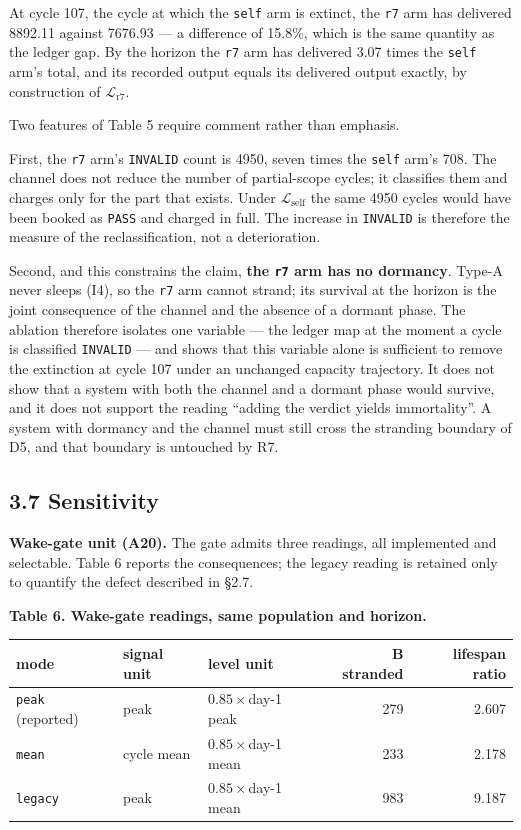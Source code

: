 \documentclass[11pt,a4paper]{article}
\newcounter{none}
\begin{document}
At cycle 107, the cycle at which the \texttt{self} arm is extinct, the \texttt{r7} arm has
delivered 8892.11 against 7676.93 --- a difference of 15.8\%, which is the same
quantity as the ledger gap. By the horizon the \texttt{r7} arm has delivered 3.07 times
the \texttt{self} arm's total, and its recorded output equals its delivered output
exactly, by construction of \(\mathcal{L}_{\mathrm{r7}}\).

Two features of Table 5 require comment rather than emphasis.

First, the \texttt{r7} arm's \texttt{INVALID} count is 4950, seven times the \texttt{self} arm's 708.
The channel does not reduce the number of partial-scope cycles; it classifies them
and charges only for the part that exists. Under \(\mathcal{L}_{\mathrm{self}}\) the
same 4950 cycles would have been booked as \texttt{PASS} and charged in full. The
increase in \texttt{INVALID} is therefore the measure of the reclassification, not a
deterioration.

Second, and this constrains the claim, \textbf{the \texttt{r7} arm has no dormancy}. Type-A
never sleeps (I4), so the \texttt{r7} arm cannot strand; its survival at the horizon is
the joint consequence of the channel and the absence of a dormant phase. The
ablation therefore isolates one variable --- the ledger map at the moment a cycle is
classified \texttt{INVALID} --- and shows that this variable alone is sufficient to remove
the extinction at cycle 107 under an unchanged capacity trajectory. It does not
show that a system with both the channel and a dormant phase would survive, and
it does not support the reading ``adding the verdict yields immortality''. A system
with dormancy and the channel must still cross the stranding boundary of D5, and
that boundary is untouched by R7.

\subsection{3.7 Sensitivity}\label{sensitivity}

\textbf{Wake-gate unit (A20).} The gate admits three readings, all implemented and
selectable. Table 6 reports the consequences; the legacy reading is retained only
to quantify the defect described in §2.7.

\textbf{Table 6. Wake-gate readings, same population and horizon.}

{\def\LTcaptype{none} %
\begin{longtable}[]{@{}lllrr@{}}
\toprule\noalign{}
mode & signal unit & level unit & B stranded & lifespan ratio \\
\midrule\noalign{}
\endhead
\bottomrule\noalign{}
\endlastfoot
\texttt{peak} (reported) & peak & \(0.85\times\)day-1 peak & 279 & 2.607 \\
\texttt{mean} & cycle mean & \(0.85\times\)day-1 mean & 233 & 2.178 \\
\texttt{legacy} & peak & \(0.85\times\)day-1 mean & 983 & 9.187 \\
\end{longtable}
}
\end{document}

